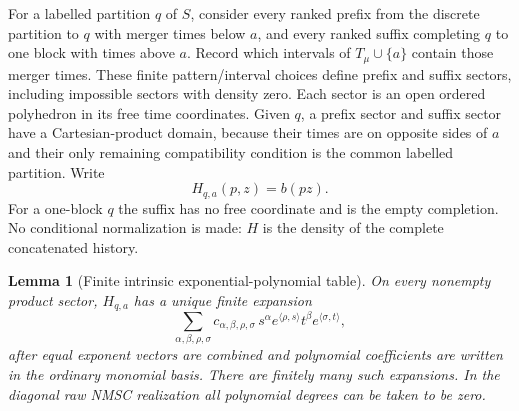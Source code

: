\documentclass[11pt]{article}
\newtheorem{lemma}[theorem]{Lemma}
\begin{document}
For a labelled partition $q$ of $S$, consider every ranked prefix from the discrete partition to $q$ with merger times below $a$, and every ranked suffix completing $q$ to one block with times above $a$.  Record which intervals of $T_\mu\cup\{a\}$ contain those merger times.  These finite pattern/interval choices define prefix and suffix sectors, including impossible sectors with density zero.  Each sector is an open ordered polyhedron in its free time coordinates.  Given $q$, a prefix sector and suffix sector have a Cartesian-product domain, because their times are on opposite sides of $a$ and their only remaining compatibility condition is the common labelled partition.  Write
\[
H_{q,a}(p,z)=b(pz).
\]
For a one-block $q$ the suffix has no free coordinate and is the empty completion.  No conditional normalization is made: $H$ is the density of the complete concatenated history.

\begin{lemma}[Finite intrinsic exponential-polynomial table]
\label{lem:supp-port-table}
On every nonempty product sector, $H_{q,a}$ has a unique finite expansion
\[
\sum_{\alpha,\beta,\rho,\sigma}
 c_{\alpha,\beta,\rho,\sigma}\,
 s^\alpha e^{\langle\rho,s\rangle}
 t^\beta e^{\langle\sigma,t\rangle},
\]
after equal exponent vectors are combined and polynomial coefficients are written in the ordinary monomial basis.  There are finitely many such expansions.  In the diagonal raw NMSC realization all polynomial degrees can be taken to be zero.
\end{lemma}
\end{document}
